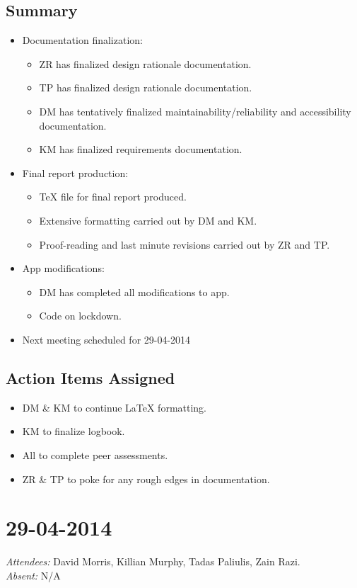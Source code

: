 \documentclass{article}
\begin{document}
\subsection*{Summary}
\begin{itemize}
\item Documentation finalization:
  \begin{itemize}
  \item ZR has finalized design rationale documentation.
  \item TP has finalized design rationale documentation.
  \item DM has tentatively finalized maintainability/reliability and accessibility documentation.
  \item KM has finalized requirements documentation.
  \end{itemize}
\item Final report production:
  \begin{itemize}
  \item TeX file for final report produced.
  \item Extensive formatting carried out by DM and KM.
  \item Proof-reading and last minute revisions carried out by ZR and TP.
  \end{itemize}
\item App modifications:
  \begin{itemize}
  \item DM has completed all modifications to app.
  \item Code on lockdown.
  \end{itemize}
\item Next meeting scheduled for 29-04-2014
\end{itemize}

\subsection*{Action Items Assigned}
\begin{itemize}
\item DM \& KM to continue LaTeX formatting.
\item KM to finalize logbook.
\item All to complete peer assessments.
\item ZR \& TP to poke for any rough edges in documentation.
\end{itemize}

\clearpage

\section*{29-04-2014}
\vspace{0.5cm}
\emph{Attendees: }David Morris, Killian Murphy, Tadas Paliulis, Zain Razi.
\\
\emph{Absent: }N/A
\end{document}
